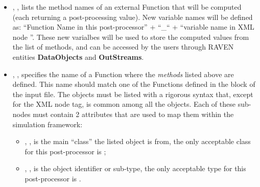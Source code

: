\begin{itemize}
  \item {}, ,
  lists the method names of an external Function that will be computed (each
  returning a post-processing value). \nb New variable names will be defined as:
  ``Function Name in this post-processor'' + ``\_`` + ``variable name in XML
  node ''. These new varialbes will be used to store the computed
  values from the list of methods, and can be accessed by the users through RAVEN
  entities \textbf{DataObjects} and \textbf{OutStreams}.
  \item {}, , specifies
  the name of a Function where the \textit{methods} listed above are defined.
  \nb This name should match one of the Functions defined in the
   block of the input file.
  The objects must be listed with a rigorous syntax that, except for the XML
  node tag, is common among all the objects.
  Each of these sub-nodes must contain 2 attributes that are used to map them
  within the simulation framework:

   \begin{itemize}
     \item {}, , is the main
     ``class'' the listed object is from, the only acceptable class for
     this post-processor is ;
     \item {}, , is the object
     identifier or sub-type, the only acceptable type for this post-processor is
     .
  \end{itemize}
\end{itemize}

